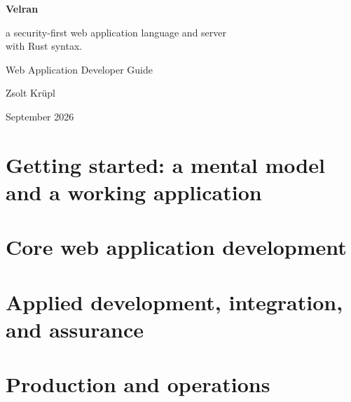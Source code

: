 \documentclass[11pt,a4paper,openany]{book}
\begin{document}
\frontmatter
\begin{titlepage}
\centering
\vspace*{0.16\textheight}
{\Huge\bfseries Velran\par}
\vspace{1.6em}
{\Large a security-first web application language and server\\with Rust syntax.\par}
\vspace{2.0em}
{\large Web Application Developer Guide\par}
\vfill
{\normalsize Zsolt Krüpl\par}
\vspace{0.7em}
{\small September 2026\par}
\end{titlepage}

\tableofcontents
\mainmatter
\part{Getting started: a mental model and a working application}




\part{Core web application development}









\part{Applied development, integration, and assurance}





\part{Production and operations}




\end{document}

